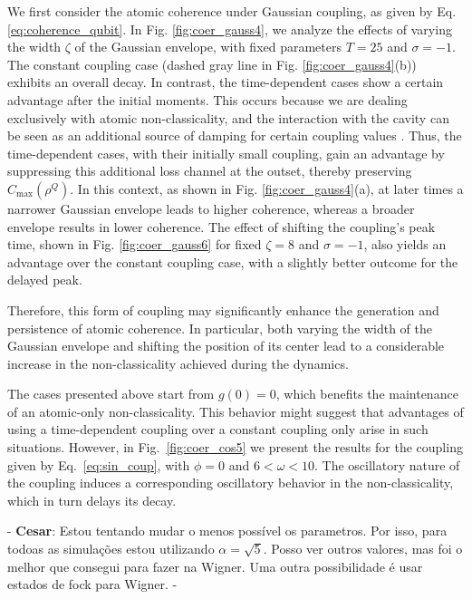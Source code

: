 \documentclass[aps,pre,superscriptaddress,twocolumn,10pt]{revtex4-2}
\newcommand{\ca}[1]{{\color{blue}- \textbf{Cesar}: #1 - }}
\begin{document}
We first consider the atomic coherence under Gaussian coupling, as given by Eq. \eqref{eq:coherence_qubit}.
In Fig. \ref{fig:coer_gauss4}, we analyze the effects of varying the width $\zeta$ of the Gaussian envelope, with fixed parameters $T = 25$ and $\sigma = -1$.
The constant coupling case (dashed gray line in Fig. \ref{fig:coer_gauss4}(b)) exhibits an overall decay. In contrast, the time-dependent cases show a certain advantage after the initial moments. This occurs because we are dealing exclusively with atomic non-classicality, and the interaction with the cavity can be seen as an additional source of damping for certain coupling values \cite{Auffeves2010}.
Thus, the time-dependent cases, with their initially small coupling, gain an advantage by suppressing this additional loss channel at the outset, thereby preserving $C_{\text{max}}(\rho^{Q})$.
In this context, as shown in Fig. \ref{fig:coer_gauss4}(a), at later times a narrower Gaussian envelope leads to higher coherence, whereas a broader envelope results in lower coherence.
The effect of shifting the coupling's peak time, shown in Fig. \ref{fig:coer_gauss6} for fixed $\zeta=8$ and $\sigma=-1$, also yields an advantage over the constant coupling case, with a slightly better outcome for the delayed peak.

Therefore, this form of coupling may significantly enhance the generation and persistence of atomic coherence. 
In particular, both varying the width of the Gaussian envelope and shifting the position of its center lead to a considerable increase in the non-classicality achieved during the dynamics. 

The cases presented above start from $g(0)=0$, which benefits the maintenance of an atomic-only non-classicality.
This behavior might suggest that advantages of using a time-dependent coupling over a constant coupling only arise in such situations. 
However, in Fig.~\ref{fig:coer_cos5} we present the results for the coupling given by Eq.~\eqref{eq:sin_coup}, with $\phi = 0$ and $6 < \omega < 10$. 
The oscillatory nature of the coupling induces a corresponding oscillatory behavior in the non-classicality, which in turn delays its decay.

\ca{Estou tentando mudar o menos possível os parametros. Por isso, para todoas as simulações estou utilizando $\alpha=\sqrt{5}$. Posso ver outros valores, mas foi o melhor que consegui para fazer na Wigner. Uma outra possibilidade é usar estados de fock para Wigner.}
\end{document}
